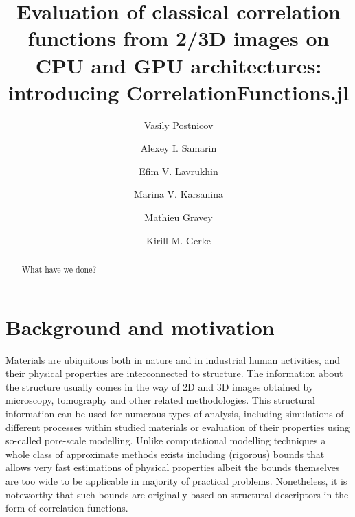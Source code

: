 \documentclass[reprint,amsmath,amssymb,aps,pre,nofootinbib]{revtex4-1}
\begin{document}
\author{Vasily Postnicov}
\author{Alexey I. Samarin}
\author{Efim V. Lavrukhin}
\author{Marina V. Karsanina}
\author{Mathieu Gravey}
\author{Kirill M. Gerke}

\title{Evaluation of classical correlation functions from 2/3D images on CPU and
  GPU architectures: introducing CorrelationFunctions.jl}

\begin{abstract}
  What have we done?
\end{abstract}

\maketitle

\section{Background and motivation}
Materials are ubiquitous both in nature and in industrial human activities, and
their physical properties are interconnected to
structure\cite{Torq_book}\cite{Sahimi_book}\cite{Adler_book}. The information
about the structure usually comes in the way of 2D and 3D images obtained by
microscopy, tomography and other related methodologies. This structural
information can be used for numerous types of analysis, including simulations of
different processes within studied materials or evaluation of their properties
using so-called pore-scale modelling. Unlike computational modelling techniques
a whole class of approximate methods exists including (rigorous) bounds that
allows very fast estimations of physical properties albeit the bounds themselves
are too wide to be applicable in majority of practical problems. Nonetheless, it
is noteworthy that such bounds are originally based on structural descriptors in
the form of correlation functions.
\end{document}
